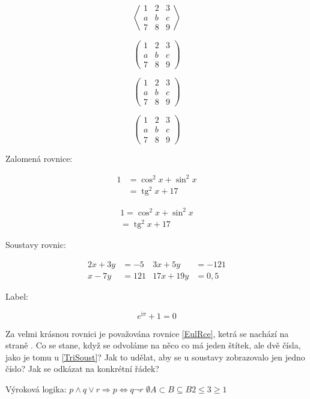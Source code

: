 \documentclass[a4paper, 12pt]{article}
\DeclareMathOperator{\tg}{tg}
\begin{document}
$$
    \left \langle
    \begin{matrix}
        1 & 2 & 3 \\
        a & b & c \\
        7 & 8 & 9
    \end{matrix}
    \right \rangle
$$

$$
    \left(
    \begin{array}{cc|c} %
            1 & 2 & 3 \\
            a & b & c \\
            \hline
            7 & 8 & 9
        \end{array}
    \right)
$$

$$
    \left(
    \begin{matrix}
            1 & 2 & 3 \\
            a & b & c \\
            7 & 8 & 9
        \end{matrix}
    \right)
$$

$$
    \left(
    \begin{smallmatrix}
            1 & 2 & 3\\
            a & b & c\\
            7 & 8 & 9
        \end{smallmatrix}
    \right)
$$

Zalomená rovnice:

\begin{equation}
    \begin{split}
        1 &=  \cos ^ 2 x + \sin ^2 x \\
        & =  \tg ^2 x + 17
    \end{split}
\end{equation}

\begin{multline}
    1 =  \cos ^ 2 x + \sin ^2 x \\
    =  \tg ^2 x + 17
\end{multline}

Soustavy rovnic:

\begin{align} \label{TriSoust}
    2x + 3y & = -5  & 3x + 5y   & = -121  \\
    x - 7y  & = 121 & 17x + 19y & = 0{,}5
\end{align}

Label:

\begin{equation} \label{EulRce}
    e^{\mathrm{i} \pi} + 1 = 0
\end{equation}

Za velmi krásnou rovnici je považována rovnice \ref{EulRce}, ketrá se nachází na straně \pageref{EulRce}.
Co se stane, když se odvoláme na něco co má jeden štítek, ale dvě čísla, jako je tomu u \ref{TriSoust}?
Jak to udělat, aby se u soustavy zobrazovalo jen jedno číslo?
Jak se odkázat na konkrétní řádek?

Výroková logika:
$p \wedge q \vee r \Rightarrow p \Leftrightarrow q \neg r$
$ \emptyset A \subset B \subseteq B 2 \leq 3 \geq 1$
\end{document}
